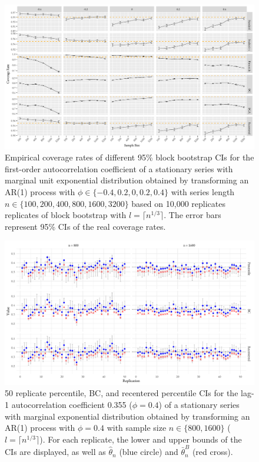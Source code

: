\documentclass[10pt]{article}
\begin{document}
\begin{figure}[tbp]
  \centering
  \includegraphics[width=\textwidth]{figures/plot_exp_phi_1}
  \caption{Empirical coverage rates of different 95\% block bootstrap CIs for 
    the first-order autocorrelation coefficient of a stationary series
    with marginal unit exponential distribution obtained by transforming an AR(1) 
    process with 
    $\phi \in \{-0.4, 0.2, 0, 0.2, 0.4\}$ with series length
    $n \in \{100, 200, 400, 800, 1600, 3200\}$ based on 10,000 replicates 
    replicates of
    block bootstrap with $l = \lceil n^{1/3} \rceil$. 
    The error bars represent 95\% CIs of the real coverage rates.}
  \label{fig:exp_phi1}
\end{figure}


\begin{figure}[tbp]
  \centering
  \includegraphics[width=\textwidth]{figures/exp_phi_intervals}
  \caption{50 replicate percentile, BC, and recentered percentile CIs for the
    lag-1 autocorrelation coefficient 0.355 ($\phi = 0.4$)
    of a stationary series with marginal exponential distribution
    obtained by transforming an AR(1) process with $\phi = 0.4$ with
    sample size $n \in \{800, 1600\}$ ($l = \lceil n^{1/3} \rceil$). For 
    each replicate, the lower and upper bounds of the CIs are displayed, as well 
    as $\hat\theta_n$ (blue circle) and $\bar\theta_n^{B}$ (red cross).}
  \label{fig:eri}
\end{figure}
\end{document}
